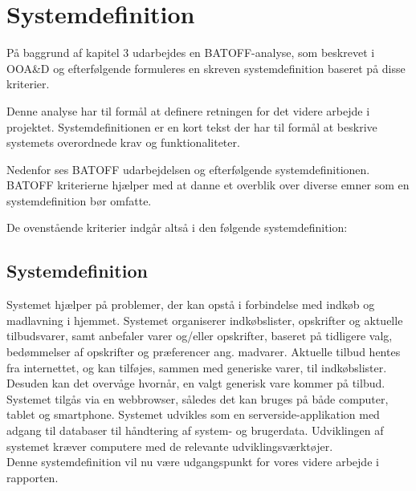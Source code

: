 \section{Systemdefinition}
På baggrund af kapitel 3 udarbejdes en BATOFF-analyse, som beskrevet i OOA\&D\citep{OOA&D2001} og efterfølgende formuleres en skreven systemdefinition baseret på disse kriterier.

Denne analyse har til formål at definere retningen for det videre arbejde i projektet.
Systemdefinitionen er en kort tekst der har til formål at beskrive systemets overordnede krav og funktionaliteter.

Nedenfor ses BATOFF udarbejdelsen og efterfølgende systemdefinitionen.
BATOFF kriterierne hjælper med at danne et overblik over diverse emner som en systemdefinition bør omfatte.



De ovenstående kriterier indgår altså i den følgende systemdefinition:

\subsection{Systemdefinition}

Systemet hjælper på problemer, der kan opstå i forbindelse med indkøb og madlavning i hjemmet.
Systemet organiserer indkøbslister, opskrifter og aktuelle tilbudsvarer, samt anbefaler varer og/eller opskrifter, baseret på tidligere valg, bedømmelser af opskrifter og præferencer ang. madvarer.
Aktuelle tilbud hentes fra internettet, og kan tilføjes, sammen med generiske varer, til indkøbslister.
Desuden kan det overvåge hvornår, en valgt generisk vare kommer på tilbud.
Systemet tilgås via en webbrowser, således det kan bruges på både computer, tablet og smartphone.
Systemet udvikles som en serverside-applikation med adgang til databaser til håndtering af system- og brugerdata.
Udviklingen af systemet kræver computere med de relevante udviklingsværktøjer.\\

Denne systemdefinition vil nu være udgangspunkt for vores videre arbejde i rapporten.
